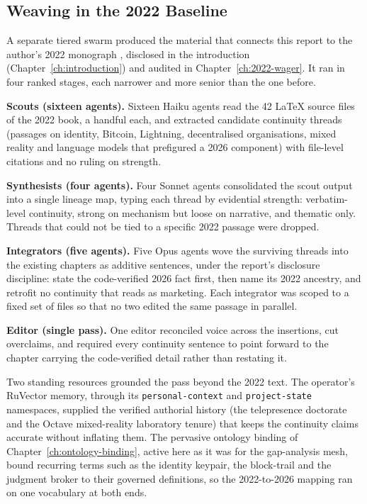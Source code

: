 \subsection{Weaving in the 2022 Baseline}

A separate tiered swarm produced the material that connects this report to the author's 2022 monograph \parencite{OHare2022Convergence}, disclosed in the introduction (Chapter~\ref{ch:introduction}) and audited in Chapter~\ref{ch:2022-wager}. It ran in four ranked stages, each narrower and more senior than the one before.

\textbf{Scouts (sixteen agents).} Sixteen Haiku agents read the 42 LaTeX source files of the 2022 book, a handful each, and extracted candidate continuity threads (passages on identity, Bitcoin, Lightning, decentralised organisations, mixed reality and language models that prefigured a 2026 component) with file-level citations and no ruling on strength.

\textbf{Synthesists (four agents).} Four Sonnet agents consolidated the scout output into a single lineage map, typing each thread by evidential strength: verbatim-level continuity, strong on mechanism but loose on narrative, and thematic only. Threads that could not be tied to a specific 2022 passage were dropped.

\textbf{Integrators (five agents).} Five Opus agents wove the surviving threads into the existing chapters as additive sentences, under the report's disclosure discipline: state the code-verified 2026 fact first, then name its 2022 ancestry, and retrofit no continuity that reads as marketing. Each integrator was scoped to a fixed set of files so that no two edited the same passage in parallel.

\textbf{Editor (single pass).} One editor reconciled voice across the insertions, cut overclaims, and required every continuity sentence to point forward to the chapter carrying the code-verified detail rather than restating it.

Two standing resources grounded the pass beyond the 2022 text. The operator's RuVector memory, through its \texttt{personal-context} and \texttt{project-state} namespaces, supplied the verified authorial history (the telepresence doctorate and the Octave mixed-reality laboratory tenure) that keeps the continuity claims accurate without inflating them. The pervasive ontology binding of Chapter~\ref{ch:ontology-binding}, active here as it was for the gap-analysis mesh, bound recurring terms such as the identity keypair, the block-trail and the judgment broker to their governed definitions, so the 2022-to-2026 mapping ran on one vocabulary at both ends.

